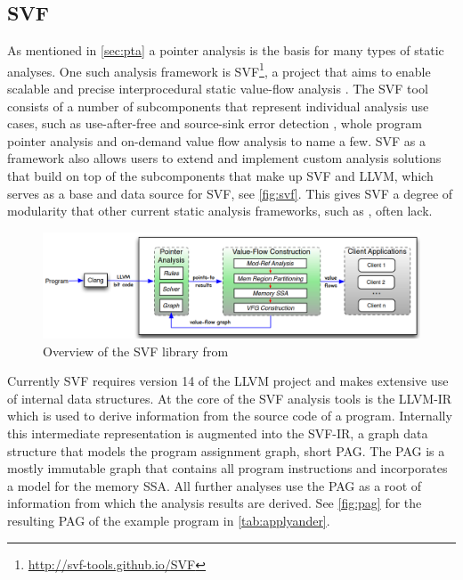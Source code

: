 \subsection{SVF}\label{sec:svf}
As mentioned in \autoref{sec:pta} a pointer analysis is the basis for many types of static analyses.
One such analysis framework is SVF\footnote{\url{http://svf-tools.github.io/SVF}}, a project that aims to enable scalable and precise interprocedural static value-flow analysis \cite{sui2016svf}. The SVF tool consists of a number of subcomponents that represent individual analysis use cases, such as use-after-free and source-sink error detection \cite{sui2014detecting}, whole program pointer analysis and on-demand value flow analysis \cite{sui2018value} to name a few.
SVF as a framework also allows users to extend and implement custom analysis solutions that build on top of the subcomponents that make up SVF and LLVM, which serves as a base and data source for SVF, see \autoref{fig:svf}.
This gives SVF a degree of modularity that other current static analysis frameworks, such as \cite{shi2018pinpoint}, often lack.

\begin{figure}
    \centering
    \includegraphics[width=1.\textwidth]{img/svf.png}
    \caption[Overview of the SVF library]{Overview of the SVF library from \cite{sui2016svf}}
    \label{fig:svf}
\end{figure}

Currently SVF requires version 14 of the LLVM project and makes extensive use of internal data structures.
At the core of the SVF analysis tools is the LLVM-IR which is used to derive information from the source code of a program. Internally this intermediate representation is augmented into the SVF-IR, a graph data structure that models the program assignment graph, short PAG. The PAG is a mostly immutable graph that contains all program instructions and incorporates a model for the memory SSA. All further analyses use the PAG as a root of information from which the analysis results are derived.
See \autoref{fig:pag} for the resulting PAG of the example program in \autoref{tab:applyander}.

